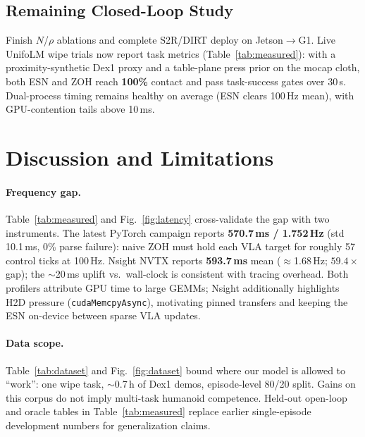 \documentclass[conference]{IEEEtran}
\begin{document}
\subsection{Remaining Closed-Loop Study}
Finish $N$/$\rho$ ablations and complete S2R/DIRT deploy on Jetson$\rightarrow$G1.
Live UnifoLM wipe trials now report task metrics (Table~\ref{tab:measured}): with a proximity-synthetic Dex1 proxy and a table-plane press prior on the mocap cloth, both ESN and ZOH reach \textbf{100\%} contact and pass task-success gates over 30\,s.
Dual-process timing remains healthy on average (ESN clears 100\,Hz mean), with GPU-contention tails above 10\,ms.

\section{Discussion and Limitations}
\paragraph{Frequency gap.}
Table~\ref{tab:measured} and Fig.~\ref{fig:latency} cross-validate the gap with two instruments.
The latest PyTorch campaign reports \textbf{570.7\,ms / 1.752\,Hz} (std\,10.1\,ms, 0\% parse failure): naive ZOH must hold each VLA target for roughly 57 control ticks at 100\,Hz.
Nsight NVTX reports \textbf{593.7\,ms} mean ($\approx$1.68\,Hz; $59.4\times$ gap); the $\sim$20\,ms uplift vs.\ wall-clock is consistent with tracing overhead.
Both profilers attribute GPU time to large GEMMs; Nsight additionally highlights H2D pressure (\texttt{cudaMemcpyAsync}), motivating pinned transfers and keeping the ESN on-device between sparse VLA updates.

\paragraph{Data scope.}
Table~\ref{tab:dataset} and Fig.~\ref{fig:dataset} bound where our model is allowed to ``work'': one wipe task, $\sim$0.7\,h of Dex1 demos, episode-level 80/20 split.
Gains on this corpus do not imply multi-task humanoid competence.
Held-out open-loop and oracle tables in Table~\ref{tab:measured} replace earlier single-episode development numbers for generalization claims.
\end{document}
